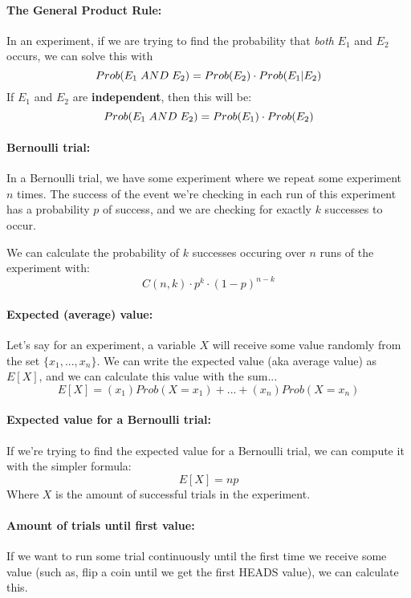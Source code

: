 \documentclass[a4paper,12pt]{book}
\begin{document}
        \paragraph{The General Product Rule:}
            In an experiment, if we are trying to find the probability
            that \textit{both} $E_{1}$ and $E_{2}$ occurs, we can solve this
            with
            $$ Prob(E_{1}\tab[0.1cm] AND \tab[0.1cm]E_{2})
                = Prob(E_{2}) \cdot Prob(E_{1} | E_{2}) $$
            If $E_{1}$ and $E_{2}$ are \textbf{independent}, then this will be:
            $$ Prob(E_{1}\tab[0.1cm] AND \tab[0.1cm]E_{2})
                = Prob(E_{1}) \cdot Prob(E_{2}) $$

        \paragraph{Bernoulli trial:}
            In a Bernoulli trial, we have some experiment where we repeat
            some experiment $n$ times. The success of the event we're
            checking in each run of this experiment has a probability $p$
            of success, and we are checking for exactly $k$ successes to
            occur.

            We can calculate the probability of $k$ successes occuring
            over $n$ runs of the experiment with:
            $$ C(n,k) \cdot p^{k} \cdot (1 - p)^{n-k} $$

        \paragraph{Expected (average) value:}
            Let's say for an experiment, a variable $X$ will receive
            some value randomly from the set $\{x_{1}, ..., x_{n}\}$.
            We can write the expected value (aka average value) as $E[X]$,
            and we can calculate this value with the sum...
            $$E[X] = (x_{1})Prob( X=x_{1} ) + ... + (x_{n})Prob(X = x_{n})$$

        \paragraph{Expected value for a Bernoulli trial:}
            If we're trying to find the expected value for a Bernoulli trial,
            we can compute it with the simpler formula:
            $$ E[X] = np $$
            Where $X$ is the amount of successful trials in the experiment.

        \paragraph{Amount of trials until first value:}
            If we want to run some trial continuously until the first time
            we receive some value (such as, flip a coin until we get the
            first HEADS value), we can calculate this.
\end{document}
